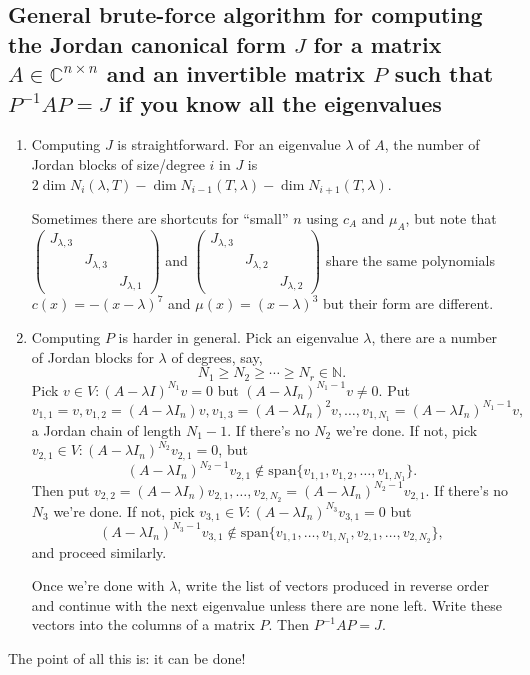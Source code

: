 \documentclass[a4paper]{article}
\newcommand{\spanset}{\text{span}}
\theoremstyle{definition}
\begin{document}
\subsection{General brute-force algorithm for computing the Jordan canonical form $J$ for a matrix $A\in \mathbb C^{n\times n}$ and an invertible matrix $P$ such that $P^{-1}AP=J$ if you know all the eigenvalues}
\begin{enumerate}
    \item Computing $J$ is straightforward. For an eigenvalue $\lambda$ of $A$, the number of Jordan blocks of size/degree $i$ in $J$ is $2\dim N_i(\lambda,T)-\dim N_{i-1}(T,\lambda)-\dim N_{i+1}(T,\lambda)$.
    
    Sometimes there are shortcuts for ``small'' $n$ using $c_{A}$ and $\mu_{A}$, but note that $\begin{pmatrix}J_{\lambda,3}&&\\ & J_{\lambda,3} & \\ & & J_{\lambda,1} \end{pmatrix}$ and $\begin{pmatrix}J_{\lambda,3}&&\\ & J_{\lambda,2} & \\ & & J_{\lambda,2} \end{pmatrix}$ share the same polynomials $c(x)=-(x-\lambda)^7$ and $\mu(x)=(x-\lambda)^3$ but their form are different.
    
    \item Computing $P$ is harder in general. Pick an eigenvalue $\lambda$, there are a number of Jordan blocks for $\lambda$ of degrees, say,
\[
N_1\geq N_2\geq \cdots \geq N_r \in \mathbb N .
\]
Pick $v\in V : (A-\lambda I)^{N_1} v=0$ but $(A-\lambda I_n)^{N_1-1}v\neq 0$. Put
\[
v_{1,1}=v, v_{1,2}=(A-\lambda I_n)v, v_{1,3}=(A-\lambda I_n)^2v, \ldots, v_{1,N_1}=(A-\lambda I_n)^{N_1-1}v,
\]
a Jordan chain of length $N_1-1$. If there's no $N_2$ we're done. If not, pick $v_{2,1}\in V:(A-\lambda I_n)^{N_2} v_{2,1}=0$, but
\[
(A-\lambda I_n)^{N_2-1} v_{2,1} \not\in \spanset \{v_{1,1},v_{1,2},\ldots,v_{1,N_1}\}.
\]
Then put $v_{2,2}=(A-\lambda I_n) v_{2,1}, \ldots ,v_{2,N_2}=(A-\lambda I_n)^{N_2-1} v_{2,1}$. If there's no $N_3$ we're done. If not, pick $v_{3,1}\in V:(A-\lambda I_n)^{N_3} v_{3,1}=0$ but
\[
(A-\lambda I_n)^{N_3-1} v_{3,1}\not\in \spanset \{v_{1,1},\ldots,v_{1,N_1},v_{2,1},\ldots,v_{2,N_2}\},
\]
and proceed similarly.
    
    Once we're done with $\lambda$, write the list of vectors produced in reverse order and continue with the next eigenvalue unless there are none left. Write these vectors into the columns of a matrix $P$. Then $P^{-1}AP=J$.
\end{enumerate}
The point of all this is: it can be done!
\end{document}
